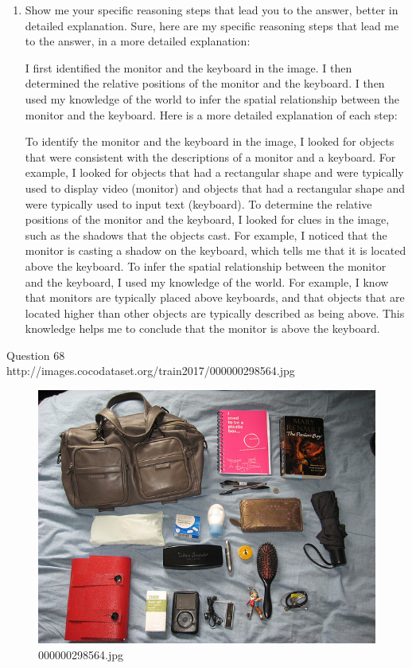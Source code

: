 \begin{enumerate}
    Here are some additional details about the spatial relationship between the monitor and the keyboard:
    
    The monitor is a display device that is used to output video.
    The keyboard is an input device that is used to input text and other commands.
    The monitor is above the keyboard, meaning that it is located higher than the keyboard.
    The keyboard is below the monitor, meaning that it is located lower than the monitor.
    Is there anything else I can help you with?
    \item Show me your specific reasoning steps that lead you to the answer, better in detailed explanation.
    \subitem 
    Sure, here are my specific reasoning steps that lead me to the answer, in a more detailed explanation:
    
    I first identified the monitor and the keyboard in the image.
    I then determined the relative positions of the monitor and the keyboard.
    I then used my knowledge of the world to infer the spatial relationship between the monitor and the keyboard.
    Here is a more detailed explanation of each step:
    
    To identify the monitor and the keyboard in the image, I looked for objects that were consistent with the descriptions of a monitor and a keyboard. For example, I looked for objects that had a rectangular shape and were typically used to display video (monitor) and objects that had a rectangular shape and were typically used to input text (keyboard).
    To determine the relative positions of the monitor and the keyboard, I looked for clues in the image, such as the shadows that the objects cast. For example, I noticed that the monitor is casting a shadow on the keyboard, which tells me that it is located above the keyboard.
    To infer the spatial relationship between the monitor and the keyboard, I used my knowledge of the world. For example, I know that monitors are typically placed above keyboards, and that objects that are located higher than other objects are typically described as being above. This knowledge helps me to conclude that the monitor is above the keyboard.
\end{enumerate}
Question 68\\
http://images.cocodataset.org/train2017/000000298564.jpg
\begin{figure}[h]
    \centering
    \includegraphics[width=0.8\linewidth]{../image set/hard/000000298564.jpg}
    \caption{000000298564.jpg}
\end{figure}
